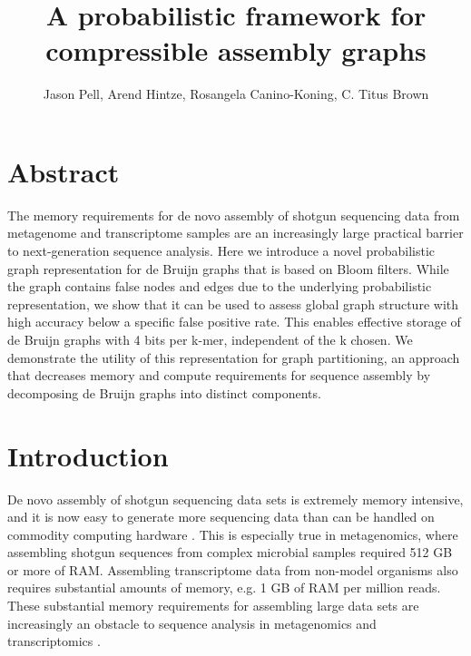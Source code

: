 \documentclass[12pt]{article} \usepackage{simplemargins}
\begin{document}
\title{A probabilistic framework for compressible assembly graphs}
\author{Jason Pell, Arend Hintze, Rosangela Canino-Koning, C. Titus Brown}

\maketitle

\section{Abstract}

The memory requirements for de novo assembly of shotgun sequencing
data from metagenome and transcriptome samples are an increasingly
large practical barrier to next-generation sequence analysis.  Here we
introduce a novel probabilistic graph representation for de Bruijn
graphs that is based on Bloom filters.  While the graph contains false nodes and
edges due to the underlying probabilistic representation, we show that
it can be used to assess global graph structure with high accuracy
below a specific false positive rate.
This enables effective storage of de Bruijn graphs with 4 bits per k-mer,
independent of the k chosen.
We demonstrate the
utility of this representation for graph partitioning, an approach
that decreases memory and compute requirements for sequence assembly
by decomposing de Bruijn graphs into distinct components.

\section{Introduction}

De novo assembly of shotgun sequencing data sets is extremely memory
intensive, and it is now easy to generate more sequencing data than
can be handled on commodity computing hardware \cite{pubmed21310981}.  This is especially
true in metagenomics, where assembling shotgun sequences
from complex microbial samples required 512 GB or more of 
RAM\cite{pmid20203603, pmid21273488}.  Assembling transcriptome data from non-model
organisms also requires substantial amounts of memory, e.g. 1 GB of
RAM per million reads\cite{trinity}.  These substantial memory requirements for
assembling large data sets are increasingly an obstacle to
sequence analysis in metagenomics and transcriptomics \cite{trinity,pubmed21310981,pubmed21304727}.
\end{document}
